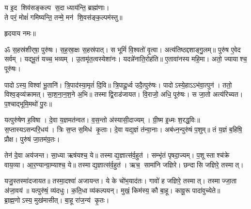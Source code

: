 \begin{center}




य इ॒द शिव॑सङ्कल्प स॒दा ध्याय॑न्ति॒ ब्राह्म॑णाः।\\
 ते परं॒ मोक्षं॑ गमिष्यन्ति॒ तन्मे॒ मन॑ शि॒वस॑ङ्क॒ल्पम॑स्तु॥

हृदयाय नमः॥
\end{center}
{\small \closesection}

ॐ स॒हस्र॑शीर्‌षा॒ पुरु॑षः। स॒ह॒स्रा॒क्षः स॒हस्र॑पात्। स भूमिं॑ वि॒श्वतो॑ वृ॒त्वा। अत्य॑तिष्ठद्दशाङ्गु॒लम्॥ पुरु॑ष ए॒वेद सर्वम्। यद्भू॒तं यच्च॒ भव्यम्। उ॒तामृ॑त॒त्वस्येशा॑नः। यदन्ने॑नाति॒रोह॑ति॥ ए॒तावा॑नस्य महि॒मा। अतो॒ ज्यायाश्च॒ पूरु॑षः।

 पादोऽस्य॒ विश्वा॑ भू॒तानि॑। त्रि॒पाद॑स्या॒मृतं॑ दि॒वि॥ त्रि॒पादू॒र्ध्व उदै॒त्पुरु॑षः। पादोऽस्ये॒हाऽऽभ॑वा॒त्पुन॑। ततो॒ विश्व॒ङ्व्य॑क्रामत्। सा॒श॒ना॒न॒श॒ने अ॒भि॥ तस्माद्वि॒राड॑जायत। वि॒राजो॒ अधि॒ पूरु॑षः। स जा॒तो अत्य॑रिच्यत। प॒श्चाद्भूमि॒मथो॑ पु॒रः॥

 यत्पुरु॑षेण ह॒विषा। दे॒वा य॒ज्ञमत॑न्वत। व॒स॒न्तो अ॑स्यासी॒दाज्यम्। ग्री॒ष्म इ॒ध्मः श॒रद्ध॒विः॥ स॒प्तास्यऽ\sav{}\-सन्परि॒धय॑। त्रिः स॒प्त स॒मिध॑ कृ॒ताः। दे॒वा यद्य॒ज्ञं त॑न्वा॒नाः। अब॑ध्न॒न्पुरु॑षं प॒शुम्॥ तं य॒ज्ञं ब॒\ar हिषि॒ प्रौक्ष\sn। पुरु॑षं जा॒तम॑ग्र॒तः।

 तेन॑ दे॒वा अय॑जन्त। सा॒ध्या ऋष॑यश्च॒ ये॥ तस्माद्य॒ज्ञात्स॑र्व॒\-हुत॑। सम्भृ॑तं पृषदा॒ज्यम्। प॒शूस्ताश्च॑क्रे वाय॒व्या\sn{}। आ॒र॒ण्यान्ग्रा॒म्याश्च॒ ये॥ तस्माद्य॒ज्ञात्स॑र्व॒हुत॑। ऋच॒ सामा॑नि जज्ञिरे। छन्दासि जज्ञिरे॒ तस्मात्।

 यजु॒स्तस्मा॑दजायत॥ तस्मा॒दश्वा॑ अजायन्त। ये के चो॑भ॒याद॑तः। गावो॑ ह जज्ञिरे॒ तस्मात्। तस्माज्जा॒ता अ॑जा॒वय॑॥ यत्पुरु॑षं॒ व्य॑दधुः। क॒ति॒धा व्य॑कल्पयन्। मुखं॒ किम॑स्य॒ कौ बा॒हू। कावू॒रू पादा॑वुच्येते॥ ब्रा॒ह्म॒णोऽस्य॒ मुख॑मासीत्। बा॒हू रा॑ज॒न्य॑ कृ॒तः।


